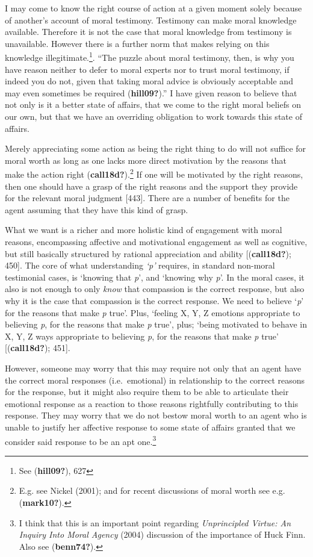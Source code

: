 \documentclass[12pt]{book}
\theoremstyle{definition}
\theoremstyle{remark}
\begin{document}
I may come to know the right course of action at a given moment solely because of another's account of moral testimony. Testimony can make moral knowledge available. Therefore it is not the case that moral knowledge from testimony is unavailable. However there is a further norm that makes relying on this knowledge illegitimate.\footnote{See (\textbf{hill09?}), 627}. ``The puzzle about moral testimony, then, is why you have reason neither to defer to moral experts nor to trust moral testimony, if indeed you do not, given that taking moral advice is obviously acceptable and may even sometimes be required (\textbf{hill09?}).'' I have given reason to believe that not only is it a better state of affairs, that we come to the right moral beliefs on our own, but that we have an overriding obligation to work towards this state of affairs.

Merely appreciating some action as being the right thing to do will not suffice for moral worth as long as one lacks more direct motivation by the reasons that make the action right (\textbf{call18d?}).\footnote{E.g. see Nickel (2001); and for recent discussions of moral worth see e.g. (\textbf{mark10?}).} If one will be motivated by the right reasons, then one should have a grasp of the right reasons and the support they provide for the relevant moral judgment {[}443{]}. There are a number of benefits for the agent assuming that they have this kind of grasp.

What we want is a richer and more holistic kind of engagement with moral reasons, encompassing affective and motivational engagement as well as cognitive, but still basically structured by rational appreciation and ability {[}(\textbf{call18d?}); 450{]}. The core of what understanding \emph{`p'} requires, in standard non-moral testimonial cases, is `knowing that \emph{p}', and `knowing why \emph{p}'. In the moral cases, it also is not enough to only \emph{know} that compassion is the correct response, but also why it is the case that compassion is the correct response. We need to believe `\emph{p}' for the reasons that make \emph{p} true'. Plus, `feeling X, Y, Z emotions appropriate to believing \emph{p}, for the reasons that make \emph{p} true', plus; `being motivated to behave in X, Y, Z ways appropriate to believing \emph{p}, for the reasons that make \emph{p} true' {[}(\textbf{call18d?}); 451{]}.

However, someone may worry that this may require not only that an agent have the correct moral responses (i.e.~emotional) in relationship to the correct reasons for the response, but it might also require them to be able to articulate their emotional response as a reaction to those reasons rightfully contributing to this response. They may worry that we do not bestow moral worth to an agent who is unable to justify her affective response to some state of affairs granted that we consider said response to be an apt one.\footnote{I think that this is an important point regarding \emph{Unprincipled {Virtue}: {An Inquiry Into Moral Agency}} (2004) discussion of the importance of Huck Finn. Also see (\textbf{benn74?}).}
\end{document}
